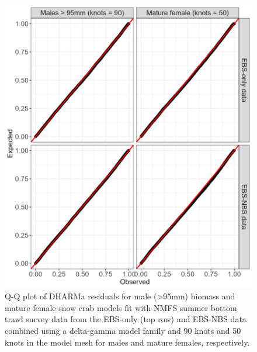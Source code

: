 \documentclass[
]{article}
\begin{document}
\begin{figure}

{\centering \includegraphics[width=1\linewidth,height=1\textheight]{../SNOW/Figures/DHARMa_EBSNBS_QQplot} 

}

\caption{Q-Q plot of DHARMa residuals for male (>95mm) biomass and mature female snow crab models fit with NMFS summer bottom trawl survey data from the EBS-only (top row) and EBS-NBS data combined using a delta-gamma model family and 90 knots and 50 knots in the model mesh for males and mature females, respectively.}\label{fig:snow-DHARMa-QQ-EBSNBS}
\end{figure}
\end{document}

